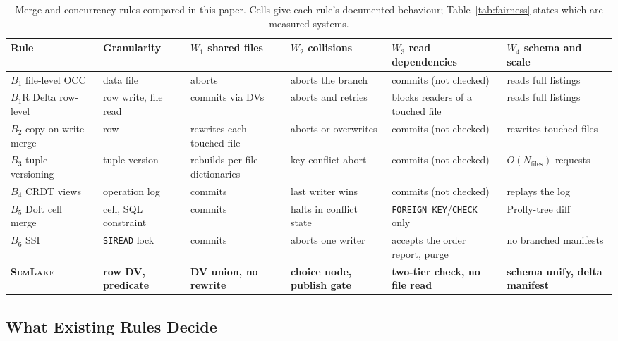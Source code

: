 \documentclass[sigconf, nonacm]{acmart}
\newcommand{\systemname}{\textsc{SemLake}}
\begin{document}
\begin{table}[t]
\centering
\scriptsize
\caption{Merge and concurrency rules compared in this paper. Cells give each rule's documented behaviour; Table~\ref{tab:fairness} states which are measured systems.}
\label{tab:existing_merges}
\renewcommand{\arraystretch}{0.9}
\setlength{\tabcolsep}{2.5pt}
\begin{tabularx}{\textwidth}{p{1.25in}p{0.85in}p{1.15in}p{1.05in}p{1.25in}X}
\toprule
\textbf{Rule} & \textbf{Granularity} & \textbf{$W_1$ shared files} & \textbf{$W_2$ collisions} & \textbf{$W_3$ read dependencies} & \textbf{$W_4$ schema and scale} \\
\midrule
$B_1$ file-level OCC~\cite{armbrust2020delta, lakefs} & data file & aborts & aborts the branch & commits (not checked) & reads full listings \\
$B_1\text{R}$ Delta row-level~\cite{delta2024rowlevel, deltaconcurrency} & row write, file read & commits via DVs & aborts and retries & blocks readers of a touched file & reads full listings \\
$B_2$ copy-on-write merge~\cite{tagliabue2024bauplan} & row & rewrites each touched file & aborts or overwrites & commits (not checked) & rewrites touched files \\
$B_3$ tuple versioning~\cite{maddox2016decibel, huang2017orpheusdb} & tuple version & rebuilds per-file dictionaries & key-conflict abort & commits (not checked) & $O(N_{\text{files}})$ requests \\
$B_4$ CRDT views~\cite{faria2025crdv} & operation log & commits & last writer wins & commits (not checked) & replays the log \\
$B_5$ Dolt cell merge~\cite{dolt2026} & cell, SQL constraint & commits & halts in conflict state & \texttt{FOREIGN KEY}/\texttt{CHECK} only & Prolly-tree diff \\
$B_6$ SSI~\cite{cahill2008serializable} & \texttt{SIREAD} lock & commits & aborts one writer & accepts the order report, purge & no branched manifests \\
\textbf{\systemname} & \textbf{row DV, predicate} & \textbf{DV union, no rewrite} & \textbf{choice node, publish gate} & \textbf{two-tier check, no file read} & \textbf{schema unify, delta manifest} \\
\bottomrule
\end{tabularx}
\end{table}

\subsection{What Existing Rules Decide}
\label{sec:bg_what_merges_decide}
\end{document}
